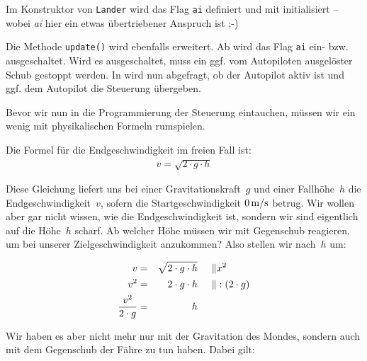 Im Konstruktor von \texttt{Lander} wird das Flag \texttt{ai} definiert und mit \false{} initialisiert -- wobei \emph{ai} hier ein etwas übertriebener Anspruch ist ;-) 


Die Methode \texttt{update()} wird ebenfalls erweitert. Ab  wird das Flag \texttt{ai} ein- bzw. ausgeschaltet. Wird es ausgeschaltet, muss ein ggf. vom Autopiloten ausgelöster Schub gestoppt werden. In  wird nun abgefragt, ob der Autopilot aktiv ist und ggf. dem Autopilot die Steuerung übergeben.



Bevor wir nun in die Programmierung der Steuerung eintauchen, müssen wir ein wenig mit physikalischen Formeln rumspielen. 

Die Formel für die Endgeschwindigkeit im freien Fall ist: 
\begin{align}
	v = \sqrt{2 \cdot g \cdot h} \label{v_eins}
\end{align}

Diese Gleichung liefert uns bei einer Gravitationskraft~$g$ und einer Fallhöhe~$h$ die Endgeschwindigkeit~$v$, sofern die Startgeschwindigkeit $\unit[0]{m/s}$ betrug. Wir wollen aber gar nicht wissen, wie die Endgeschwindigkeit ist, sondern wir sind eigentlich auf die Höhe~$h$ scharf. Ab welcher Höhe müssen wir mit Gegenschub reagieren, um bei unserer Zielgeschwindigkeit anzukommen? Also stellen wir  nach~$h$ um:

\begin{align}
	v             &=& \sqrt{2 \cdot g \cdot h} &\hspace{0.5cm}\| x^2\nonumber\\
	v^2           &=& 2 \cdot g \cdot h        &\hspace{0.5cm}\| :(2 \cdot g)\nonumber\\
	\frac{v^2}{2 \cdot g} &=& h &  \label{h_eins}
\end{align}


Wir haben es aber nicht mehr nur mit der Gravitation des Mondes, sondern auch mit dem Gegenschub der Fähre zu tun haben. Dabei gilt: 

